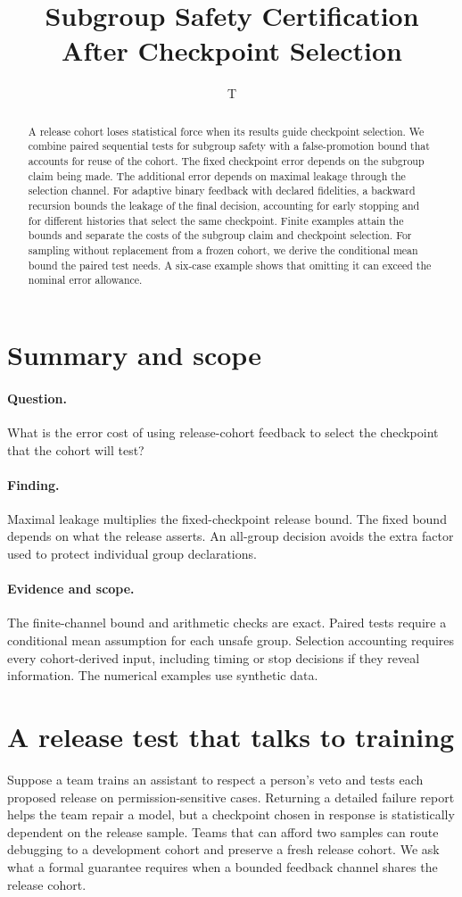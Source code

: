 \documentclass[11pt]{article}
\title{Subgroup Safety Certification After Checkpoint Selection}
\author{T}
\date{}
\begin{document}
\maketitle
\begin{abstract}
A release cohort loses statistical force when its results guide checkpoint
selection. We combine paired sequential tests for subgroup safety with a
false-promotion bound that accounts for reuse of the cohort. The fixed
checkpoint error depends on the subgroup claim being made. The additional
error depends on maximal leakage through the selection channel. For
adaptive binary feedback with declared fidelities, a backward recursion
bounds the leakage of the final decision, accounting for early stopping
and for different histories that select the same checkpoint. Finite
examples attain the bounds and separate the costs of the subgroup claim
and checkpoint selection. For sampling without replacement from a
frozen cohort, we derive the conditional mean bound the paired test
needs. A six-case example shows that omitting it can exceed the
nominal error allowance.
\end{abstract}

\section*{Summary and scope}
\paragraph{Question.} What is the error cost of using release-cohort
feedback to select the checkpoint that the cohort will test?
\paragraph{Finding.} Maximal leakage multiplies the fixed-checkpoint
release bound. The fixed bound depends on what the release asserts.
An all-group decision avoids the extra factor used to protect
individual group declarations.
\paragraph{Evidence and scope.} The finite-channel bound
and arithmetic checks are exact. Paired tests require a conditional
mean assumption for each unsafe group. Selection accounting requires
every cohort-derived input, including timing or stop decisions if they
reveal information. The numerical examples use synthetic data.

\section{A release test that talks to training}
Suppose a team trains an assistant to respect a person's veto and tests
each proposed release on permission-sensitive cases. Returning a
detailed failure report helps the team repair a model, but a checkpoint
chosen in response is statistically dependent on the release sample.
Teams that can afford two samples can route debugging to a development
cohort and preserve a fresh release cohort. We ask what a formal guarantee
requires when a bounded feedback channel shares the release cohort.
\end{document}
